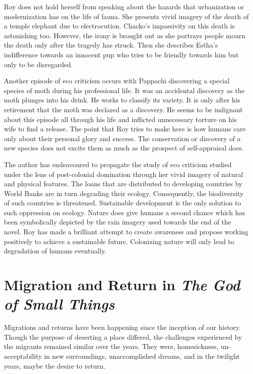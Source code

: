 Roy does not hold herself from speaking about the hazards that urbanization or modernization has on the life of fauna. She presents vivid imagery of the death of a temple elephant due to electrocution. \linebreak Chacko's impassivity on this death is astonishing too. However, the irony is brought out as she portrays people mourn the death only after the tragedy has struck. Then she describes Estha's indifference towards an innocent pup who tries to be friendly towards him but only to be disregarded. 

Another episode of eco criticism occurs with Pappachi discovering a special species of moth during his professional life. It was an accidental discovery as the moth plunges into his drink. He works to classify its variety. It is only after his retirement that the moth was declared as a discovery. He seems to be indignant about this episode all through his life and inflicted unnecessary torture on his wife to find a release. The point that Roy tries to make here is how humans care only about their personal glory and success. The conservation or discovery of a new species does not excite them as much as the prospect of self-appraisal does. 

The author has endeavoured to propagate the study of eco criticism studied under the lens of post-colonial domination through her vivid imagery of natural and physical features. The loans that are distributed to developing countries by World Banks are in turn degrading their ecology. Consequently, the biodiversity of such countries is threatened. Sustainable development is the only solution to such oppression on ecology. Nature does give humans a second chance which has been symbolically depicted by the rain imagery used towards the end of the novel. Roy has made a brilliant attempt to create awareness and propose working positively to achieve a sustainable future. Colonizing nature will only lead to degradation of humans eventually. 

\section{Migration and Return in \emph{The God of Small Things}}

Migrations and returns have been happening since the inception of our history. Though the purpose of deserting a place differed, the challenges experienced by the migrants remained similar over the years. They were, homesickness, un-acceptability in new surroundings, unaccomplished \linebreak dreams, and in the twilight years, maybe the desire to return. 

